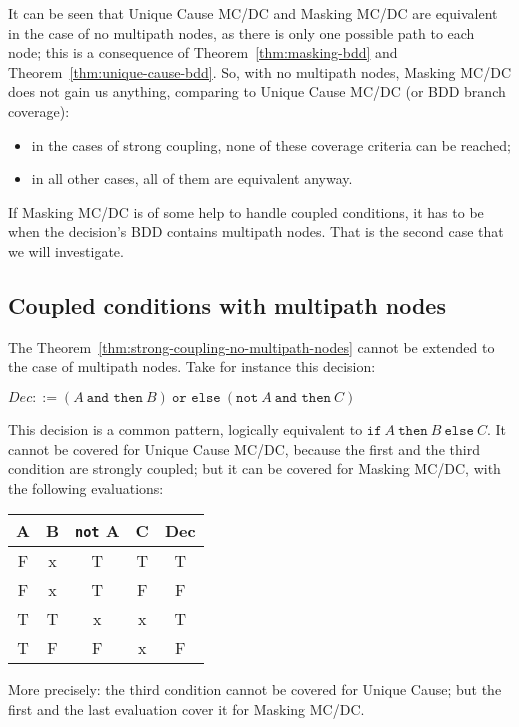 \documentclass[a4paper,12pt,twoside]{article}
\newcommand{\andthen}{\texttt{and then}}
\newcommand{\orelse}{\texttt{or else}}
\newcommand{\adanot}{\texttt{not}}
\newcommand{\adaif}{\texttt{if}}
\newcommand{\adathen}{\texttt{then}}
\newcommand{\adaelse}{\texttt{else}}
\begin{document}
It can be seen that Unique Cause MC/DC and Masking
MC/DC are equivalent in the case of no multipath nodes, as there is only one
possible path to each node; this is a consequence of
Theorem~\ref{thm:masking-bdd} and Theorem~\ref{thm:unique-cause-bdd}.
So, with no multipath nodes, Masking MC/DC does not gain us anything, comparing
to Unique Cause MC/DC (or BDD branch coverage):
\begin{itemize}
\item in the cases of strong coupling, none of these coverage criteria
can be reached;
\item in all other cases, all of them are equivalent anyway.
\end{itemize}

If Masking MC/DC is of some help to handle coupled conditions, it has
to be when the decision's BDD contains multipath nodes. That is the
second case that we will investigate.

\subsection{Coupled conditions with multipath nodes}

The Theorem~\ref{thm:strong-coupling-no-multipath-nodes} cannot be
extended to the case of multipath nodes. Take for instance this decision:

$Dec ::= (A \ \andthen{} \ B) \ \orelse{} \ (\adanot{} \ A \ \andthen{} \ C)$

This decision is a common pattern, logically equivalent to
$\adaif{} \ A \ \adathen{} \ B \ \adaelse \ C$. It cannot be covered for
Unique Cause MC/DC, because the first and the third condition are strongly
coupled; but it can be covered for Masking MC/DC, with the following
evaluations:

\begin{center}
\begin{tabular}{|c|c|c|c||c|}
\hline
A & B & \adanot{} A & C & Dec\\ \hline
F & x & T           & T & T \\ \hline
F & x & T           & F & F \\ \hline
T & T & x           & x & T \\ \hline
T & F & F           & x & F \\ \hline
\end{tabular}
\end{center}

More precisely: the third condition cannot be covered for Unique Cause;
but the first and the last evaluation cover it for Masking MC/DC.
\end{document}
